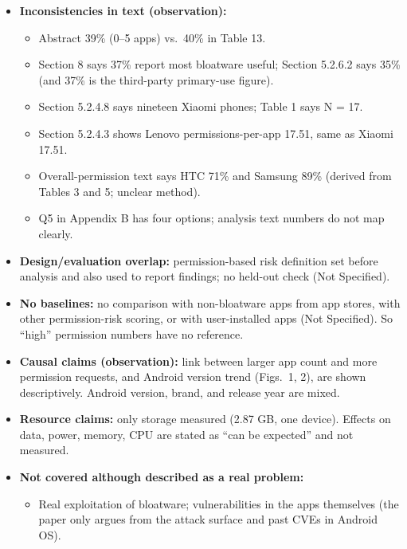 \documentclass[11pt,a4paper]{article}
\begin{document}
\begin{enumerate}
\begin{itemize}[leftmargin=*, itemsep=1pt, topsep=2pt]
\begin{itemize}[itemsep=0pt]
            \item Claim of no link between background and app use is based on visual reading of Table 14, no test; many profession groups have 1--8 respondents.
        \end{itemize}
        \item \textbf{Inconsistencies in text (observation):}
        \begin{itemize}[itemsep=0pt]
            \item Abstract 39\% (0--5 apps) vs.\ 40\% in Table 13.
            \item Section 8 says 37\% report most bloatware useful; Section 5.2.6.2 says 35\% (and 37\% is the third-party primary-use figure).
            \item Section 5.2.4.8 says nineteen Xiaomi phones; Table 1 says N = 17.
            \item Section 5.2.4.3 shows Lenovo permissions-per-app 17.51, same as Xiaomi 17.51.
            \item Overall-permission text says HTC 71\% and Samsung 89\% (derived from Tables 3 and 5; unclear method).
            \item Q5 in Appendix B has four options; analysis text numbers do not map clearly.
        \end{itemize}
        \item \textbf{Design/evaluation overlap:} permission-based risk definition set before analysis and also used to report findings; no held-out check (Not Specified).
        \item \textbf{No baselines:} no comparison with non-bloatware apps from app stores, with other permission-risk scoring, or with user-installed apps (Not Specified). So ``high'' permission numbers have no reference.
        \item \textbf{Causal claims (observation):} link between larger app count and more permission requests, and Android version trend (Figs.\ 1, 2), are shown descriptively. Android version, brand, and release year are mixed.
        \item \textbf{Resource claims:} only storage measured (2.87 GB, one device). Effects on data, power, memory, CPU are stated as ``can be expected'' and not measured.
        \item \textbf{Not covered although described as a real problem:}
        \begin{itemize}[itemsep=0pt]
            \item Real exploitation of bloatware; vulnerabilities in the apps themselves (the paper only argues from the attack surface and past CVEs in Android OS).

\end{itemize}
\end{itemize}
\end{enumerate}
\end{document}
